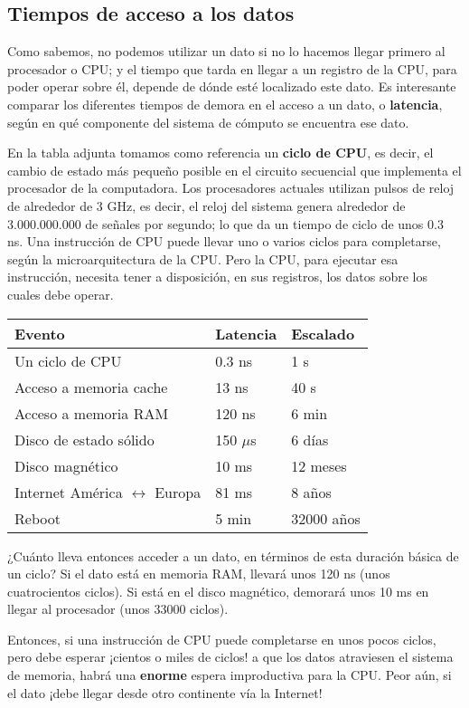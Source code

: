 \documentclass[spanish,a4paper,]{article}
\begin{document}
\hypertarget{tiempos-de-acceso-a-los-datos}{%
\subsection{Tiempos de acceso a los
datos}\label{tiempos-de-acceso-a-los-datos}}

Como sabemos, no podemos utilizar un dato si no lo hacemos llegar
primero al procesador o CPU; y el tiempo que tarda en llegar a un
registro de la CPU, para poder operar sobre él, depende de dónde esté
localizado este dato. Es interesante comparar los diferentes tiempos de
demora en el acceso a un dato, o \textbf{latencia}, según en qué
componente del sistema de cómputo se encuentra ese dato.

En la tabla adjunta tomamos como referencia un \textbf{ciclo de CPU}, es
decir, el cambio de estado más pequeño posible en el circuito secuencial
que implementa el procesador de la computadora. Los procesadores
actuales utilizan pulsos de reloj de alrededor de 3 GHz, es decir, el
reloj del sistema genera alrededor de 3.000.000.000 de señales por
segundo; lo que da un tiempo de ciclo de unos 0.3 ns. Una instrucción de
CPU puede llevar uno o varios ciclos para completarse, según la
microarquitectura de la CPU. Pero la CPU, para ejecutar esa instrucción,
necesita tener a disposición, en sus registros, los datos sobre los
cuales debe operar.

\begin{longtable}[]{@{}lll@{}}
\toprule
Evento & Latencia & Escalado\tabularnewline
\midrule
\endhead
Un ciclo de CPU & 0.3 ns & 1 s\tabularnewline
Acceso a memoria cache & 13 ns & 40 s\tabularnewline
Acceso a memoria RAM & 120 ns & 6 min\tabularnewline
Disco de estado sólido & 150 \(\mu\)s & 6 días\tabularnewline
Disco magnético & 10 ms & 12 meses\tabularnewline
Internet América \(\longleftrightarrow\) Europa & 81 ms & 8
años\tabularnewline
Reboot & 5 min & 32000 años\tabularnewline
\bottomrule
\end{longtable}

¿Cuánto lleva entonces acceder a un dato, en términos de esta duración
básica de un ciclo? Si el dato está en memoria RAM, llevará unos 120 ns
(unos cuatrocientos ciclos). Si está en el disco magnético, demorará
unos 10 ms en llegar al procesador (unos 33000 ciclos).

Entonces, si una instrucción de CPU puede completarse en unos pocos
ciclos, pero debe esperar ¡cientos o miles de ciclos! a que los datos
atraviesen el sistema de memoria, habrá una \textbf{enorme} espera
improductiva para la CPU. Peor aún, si el dato ¡debe llegar desde otro
continente vía la Internet!
\end{document}
